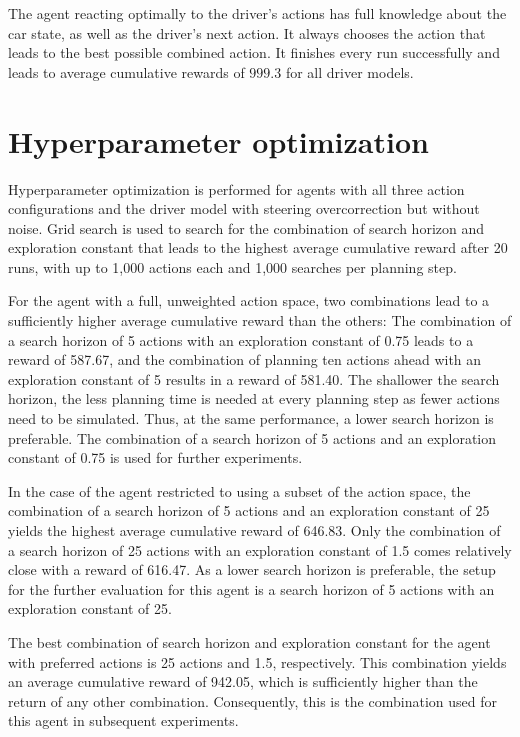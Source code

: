 The agent reacting optimally to the driver's actions has full knowledge about the car state, as well as the driver's next action. It always chooses the action that leads to the best possible combined action. It finishes every run successfully and leads to average cumulative rewards of $999.3$ for all driver models.



\section{Hyperparameter optimization}
\label{sec:grid_search}

Hyperparameter optimization is performed for agents with all three action configurations and the driver model with steering overcorrection but without noise. Grid search is used to search for the combination of search horizon and exploration constant that leads to the highest average cumulative reward after 20 runs, with up to 1,000 actions each and 1,000 searches per planning step.



\noindent
For the agent with a full, unweighted action space, two combinations lead to a sufficiently higher average cumulative reward than the others: The combination of a search horizon of 5 actions with an exploration constant of 0.75 leads to a reward of 587.67, and the combination of planning ten actions ahead with an exploration constant of 5 results in a reward of 581.40. The shallower the search horizon, the less planning time is needed at every planning step as fewer actions need to be simulated. Thus, at the same performance, a lower search horizon is preferable. The combination of a search horizon of 5 actions and an exploration constant of 0.75 is used for further experiments.

In the case of the agent restricted to using a subset of the action space, the combination of a search horizon of 5 actions and an exploration constant of 25 yields the highest average cumulative reward of 646.83. Only the combination of a search horizon of 25 actions with an exploration constant of 1.5 comes relatively close with a reward of 616.47. As a lower search horizon is preferable, the setup for the further evaluation for this agent is a search horizon of 5 actions with an exploration constant of 25. 

The best combination of search horizon and exploration constant for the agent with preferred actions is 25 actions and 1.5, respectively. This combination yields an average cumulative reward of 942.05, which is sufficiently higher than the return of any other combination. Consequently, this is the combination used for this agent in subsequent experiments.

